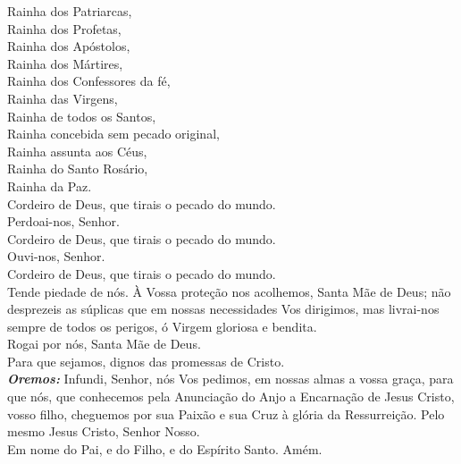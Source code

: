 \begin{flushleft}
    \VbarRed{} Rainha dos Patriarcas, \\
    \VbarRed{} Rainha dos Profetas, \\
    \VbarRed{} Rainha dos Apóstolos, \\
    \VbarRed{} Rainha dos Mártires, \\
    \VbarRed{} Rainha dos Confessores da fé, \\
    \VbarRed{} Rainha das Virgens, \\
    \VbarRed{} Rainha de todos os Santos, \\
    \VbarRed{} Rainha concebida sem pecado original, \\
    \VbarRed{} Rainha assunta aos Céus, \\
    \VbarRed{} Rainha do Santo Rosário, \\
    \VbarRed{} Rainha da Paz.
    \vspace{.2cm} \\
    \VbarRed{} Cordeiro de Deus, que tirais o pecado do mundo. \\
    \RbarRed{} Perdoai-nos, Senhor. \\
    \VbarRed{} Cordeiro de Deus, que tirais o pecado do mundo. \\
    \RbarRed{} Ouvi-nos, Senhor. \\
    \VbarRed{} Cordeiro de Deus, que tirais o pecado do mundo. \\
    \RbarRed{} Tende piedade de nós.
    \newpage
    À Vossa proteção nos acolhemos, Santa Mãe de Deus; não desprezeis as súplicas que em nossas necessidades Vos dirigimos, mas livrai-nos sempre de todos os perigos, ó Virgem gloriosa e bendita.
    \vspace{.2cm} \\
    \VbarRed{} Rogai por nós, Santa Mãe de Deus. \\
    \RbarRed{} Para que sejamos, dignos das promessas de Cristo.
    \vspace{.2cm} \\
    \textbf{\textit{Oremos:}} Infundi, Senhor, nós Vos pedimos, em nossas almas a vossa graça, para que nós, que conhecemos pela Anunciação do Anjo a Encarnação de Jesus Cristo, vosso filho, cheguemos por sua Paixão e sua Cruz à glória da Ressurreição. Pelo mesmo Jesus Cristo, Senhor Nosso.
    \vspace{.2cm} \\
    Em nome do Pai, \grecrossRed{} e do Filho, e do Espírito Santo. Amém.
\end{flushleft}
